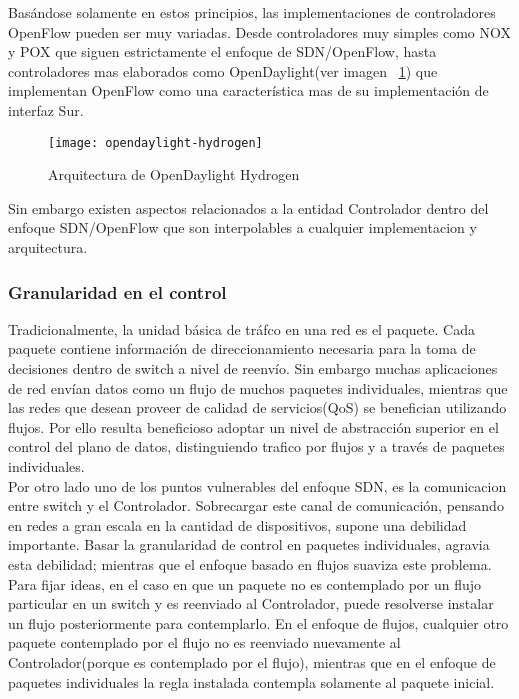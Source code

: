 Basándose solamente en estos principios, las implementaciones de controladores OpenFlow pueden ser muy variadas. Desde controladores muy simples como NOX y POX que siguen estrictamente el enfoque de SDN/OpenFlow, hasta controladores mas elaborados como OpenDaylight(ver imagen ~\ref{fig:OpenDayLightHydrogen}) que implementan OpenFlow como una característica mas de su implementaci\'on de interfaz Sur.

\newpage
\begin{figure}[htbp!] 
\centering    
\texttt{[image: opendaylight-hydrogen]}
\caption[OF 1.3.3 Matching Fields]{Arquitectura de OpenDaylight Hydrogen}
\label{fig:OpenDayLightHydrogen}
\end{figure}

Sin embargo existen aspectos relacionados a la entidad Controlador dentro del enfoque SDN/OpenFlow que son interpolables a cualquier implementacion y arquitectura.
  
\subsubsection{Granularidad en el control}
Tradicionalmente, la unidad básica de tráfco en una red es el paquete. Cada paquete contiene información de direccionamiento necesaria para la toma de decisiones dentro de switch a nivel de reenvío. Sin embargo muchas aplicaciones de red envían datos como un flujo de muchos paquetes individuales, mientras que las redes que desean proveer de calidad de servicios(QoS) se benefician utilizando flujos. Por ello resulta beneficioso adoptar un nivel de abstracción superior en el control del plano de datos, distinguiendo trafico por flujos y a través de paquetes individuales.\\
 
Por otro lado uno de los puntos vulnerables del enfoque SDN, es la comunicacion entre switch y el Controlador. Sobrecargar este canal de comunicación, pensando en redes a gran escala en la cantidad de dispositivos, supone una debilidad importante. Basar la granularidad de control en paquetes individuales, agravia esta debilidad; mientras que el enfoque basado en flujos suaviza este problema. Para fijar ideas, en el caso en que un paquete no es contemplado por un flujo particular en un switch y es reenviado al Controlador, puede resolverse instalar un flujo posteriormente para contemplarlo. En el enfoque de flujos, cualquier otro paquete contemplado por el flujo no es reenviado nuevamente al Controlador(porque es contemplado por el flujo), mientras que en el enfoque de paquetes individuales la regla instalada contempla solamente al paquete inicial.

